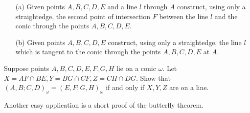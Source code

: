 \begin{exer}\label{conicline}\hspace{2em}
\begin{itemize}
\item[(a)] Given points $A,B,C,D,E$ and a line $l$ through $A$ construct, using only a straightedge, the second point of intersection $F$ between the line $l$ and the conic through the points $A,B,C,D,E$.

\item[(b)] Given points $A,B,C,D,E$ construct, using only a straightedge, the line $l$ which is tangent to the conic through the points $A,B,C,D,E$ at $A$.
\end{itemize}
\end{exer}

\begin{exer} Suppose points $A,B,C,D,E,F,G,H$ lie on a conic $\omega$. Let $X = AF\cap BE, Y = BG\cap CF, Z = CH\cap DG$. Show that $(A,B;C,D)_\omega = (E,F;G,H)_\omega$ if and only if $X,Y,Z$ are on a line.
\end{exer}

Another easy application is a short proof of the butterfly theorem.

